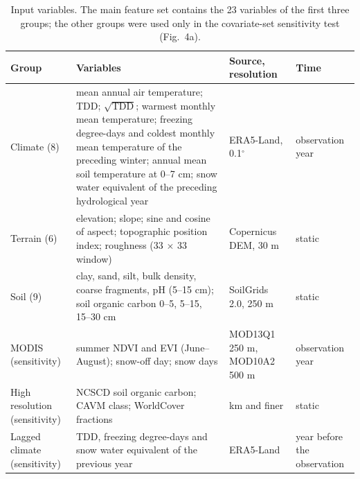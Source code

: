\documentclass[pdflatex,sn-nature]{sn-jnl}
\begin{document}
\begin{table}[htbp]
\caption{Input variables. The main feature set contains the 23 variables of the first three groups; the other groups were used only in the covariate-set sensitivity test (Fig.~4a).}\label{tab:s2}
\scriptsize
\begin{tabular}{@{}>{\raggedright\arraybackslash}p{}>{\raggedright\arraybackslash}p{}>{\raggedright\arraybackslash}p{}>{\raggedright\arraybackslash}p{}@{}}
\toprule
Group & Variables & Source, resolution & Time \\
\midrule
Climate (8) & mean annual air temperature; TDD; $\sqrt{\mathrm{TDD}}$; warmest monthly mean temperature; freezing degree-days and coldest monthly mean temperature of the preceding winter; annual mean soil temperature at 0--7 cm; snow water equivalent of the preceding hydrological year & ERA5-Land, 0.1$^\circ$ & observation year \\
Terrain (6) & elevation; slope; sine and cosine of aspect; topographic position index; roughness (33 $\times$ 33 window) & Copernicus DEM, 30 m & static \\
Soil (9) & clay, sand, silt, bulk density, coarse fragments, pH (5--15 cm); soil organic carbon 0--5, 5--15, 15--30 cm & SoilGrids 2.0, 250 m & static \\
MODIS (sensitivity) & summer NDVI and EVI (June--August); snow-off day; snow days & MOD13Q1 250 m, MOD10A2 500 m & observation year \\
High resolution (sensitivity) & NCSCD soil organic carbon; CAVM class; WorldCover fractions & 1 km and finer & static \\
Lagged climate (sensitivity) & TDD, freezing degree-days and snow water equivalent of the previous year & ERA5-Land & year before the observation \\
\bottomrule
\end{tabular}
\end{table}
\end{document}
